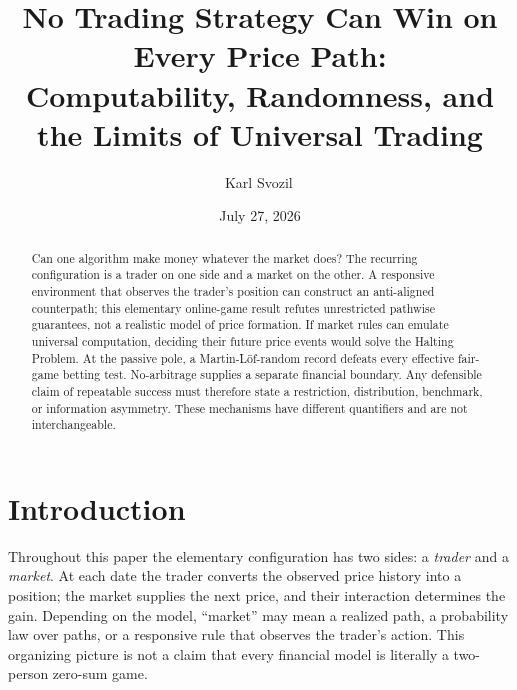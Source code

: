\documentclass[aps,pra,reprint,superscriptaddress,amsmath,amssymb,floatfix]{revtex4-2}
\theoremstyle{plain}
\theoremstyle{definition}
\theoremstyle{remark}
\begin{document}
\title{No Trading Strategy Can Win on Every Price Path:\\
Computability, Randomness, and the Limits of Universal Trading}

\author{Karl Svozil\,}

\date{July 27, 2026}

\begin{abstract}
Can one algorithm make money whatever the market does? The recurring
configuration is a trader on one side and a market on the other. A responsive
environment that observes the trader's position can construct an anti-aligned
counterpath; this elementary online-game result refutes unrestricted pathwise
guarantees, not a realistic model of price formation. If market rules can
emulate universal computation, deciding their future price events would solve
the Halting Problem. At the passive pole, a Martin-L\"of-random record defeats
every effective fair-game betting test. No-arbitrage supplies a separate
financial boundary. Any defensible claim of repeatable success must therefore
state a restriction, distribution, benchmark, or information asymmetry. These
mechanisms have different quantifiers and are not interchangeable.
\end{abstract}

\maketitle

\section{Introduction}
\label{sec:intro}

Throughout this paper the elementary configuration has two sides: a
\emph{trader} and a \emph{market}. At each date the trader converts the
observed price history into a position; the market supplies the next price,
and their interaction determines the gain. Depending on the model, ``market''
may mean a realized path, a probability law over paths, or a responsive rule
that observes the trader's action. This organizing picture is not a claim that
every financial model is literally a two-person zero-sum game.
\end{document}
